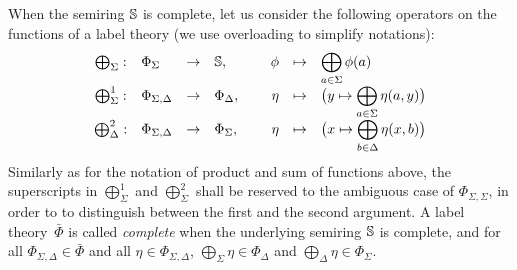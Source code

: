 \noindent
When the semiring $\mathbb{S}$ is complete, 
let us consider the following operators on the functions of a label theory
(we use overloading to simplify notations):
\[
\begin{array}{clclcrcl}
\bigoplus_\Sigma : 
  & \Phi_\Sigma & \to & \mathbb{S}, & \  
  & \phi & \mapsto & \displaystyle\bigoplus_{a \in \Sigma} \phi(a)\\
\bigoplus^1_\Sigma : 
  & \Phi_{\Sigma,\Delta} & \to & \Phi_\Delta, & 
  & \eta & \mapsto & \bigl( y \mapsto \displaystyle\bigoplus_{a \in \Sigma} \eta(a, y) \bigr)\\
\bigoplus^2_\Delta : 
  & \Phi_{\Sigma,\Delta} & \to & \Phi_\Sigma, & 
  & \eta & \mapsto & \bigl( x \mapsto \displaystyle\bigoplus_{b \in \Delta} \eta(x, b) \bigr)\\
\end{array}
\]
%
Similarly as for the notation of product and sum of functions above, 
the superscripts in $\bigoplus^1_\Sigma$ and $\bigoplus^2_\Sigma$
shall be reserved to the ambiguous case of $\Phi_{\Sigma,\Sigma}$,
in order to to distinguish between the first and the second argument.
%
A label theory~$\bar\Phi$ is called \emph{complete} when 
the underlying semiring $\mathbb{S}$ is complete, and
for all $\Phi_{\Sigma, \Delta} \in \bar\Phi$ 
and all $\eta \in \Phi_{\Sigma, \Delta}$,
$\bigoplus_\Sigma \eta \in \Phi_{\Delta}$ and 
$\bigoplus_\Delta \eta \in \Phi_{\Sigma}$.

